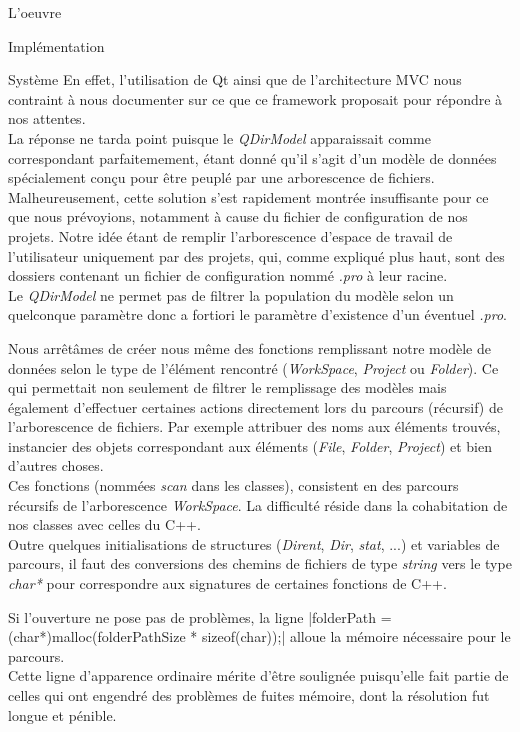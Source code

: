 \documentclass[a4paper, 12pt]{report}
\begin{document}
\begin{part}{L'oeuvre}
\begin{chapter}{Implémentation}
\begin{section}{Système}
				En effet, l'utilisation de \gls{Qt} ainsi que de l'architecture \gls{MVC} nous contraint à nous documenter sur ce que ce 
				framework proposait pour répondre à nos attentes.\\
				La réponse ne tarda point puisque le \emph{QDirModel} apparaissait comme correspondant parfaitemement, étant donné qu'il s'agit d'un
				modèle de données spécialement conçu pour être peuplé par une arborescence de fichiers.\\


				Malheureusement, cette solution s'est rapidement montrée insuffisante pour ce que nous prévoyions, notamment à cause du fichier de 
				configuration de nos projets. Notre idée étant de remplir l'arborescence d'espace de travail de l'utilisateur uniquement par des
				projets, qui, comme expliqué plus haut, sont des dossiers contenant un fichier de configuration nommé \emph{.pro} à leur racine.\\
				Le \emph{QDirModel} ne permet pas de filtrer la population du modèle selon un quelconque paramètre donc a fortiori le paramètre
				d'existence d'un éventuel \emph{.pro}.

				Nous arrêtâmes de créer nous même des fonctions remplissant notre modèle de données selon le type de l'élément rencontré
				(\emph{WorkSpace}, \emph{Project} ou \emph{Folder}). Ce qui permettait non seulement de filtrer le remplissage des modèles mais
				également d'effectuer certaines actions directement lors du parcours (récursif) de l'arborescence de fichiers.
				Par exemple attribuer des noms aux éléments trouvés, instancier des objets correspondant aux éléments (\emph{File}, \emph{Folder},
				\emph{Project}) et bien d'autres choses.\\


				Ces fonctions (nommées \emph{scan} dans les classes), consistent en des parcours récursifs de l'arborescence \emph{WorkSpace}.
				La difficulté réside dans la cohabitation de nos classes avec celles du \gls{C++}.\\
				Outre quelques initialisations de structures (\emph{Dirent}, \emph{Dir}, \emph{stat}, ...) et variables de parcours, il faut des
				conversions des chemins de fichiers de type \emph{string} vers le type \emph{char*} pour correspondre aux signatures de certaines
				fonctions de \gls{C++}.


				Si l'ouverture ne pose pas de problèmes, la ligne |folderPath = (char*)malloc(folderPathSize * sizeof(char));|
				alloue la mémoire nécessaire pour le parcours.\\
				Cette ligne d'apparence ordinaire mérite d'être soulignée puisqu'elle fait partie de celles qui ont engendré des problèmes de fuites 
				mémoire, dont la résolution fut longue et pénible.\\



\end{section}
\end{chapter}
\end{part}
\end{document}
